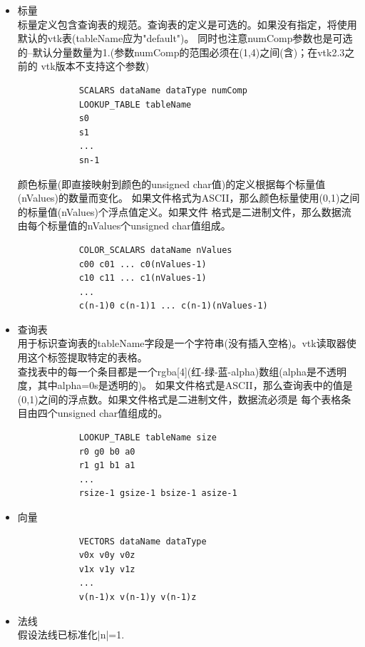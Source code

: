 \documentclass[UTF8]{ctexart}
\begin{document}
\begin{itemize}
    \item {
        标量 \\
        标量定义包含查询表的规范。查询表的定义是可选的。如果没有指定，将使用默认的vtk表(tableName应为"default")。
        同时也注意numComp参数也是可选的--默认分量数量为1.(参数numComp的范围必须在(1,4)之间(含)；在vtk2.3之前的
        vtk版本不支持这个参数)
        \begin{verbatim}
            SCALARS dataName dataType numComp
            LOOKUP_TABLE tableName
            s0
            s1
            ... 
            sn-1
        \end{verbatim}
        颜色标量(即直接映射到颜色的unsigned char值)的定义根据每个标量值(nValues)的数量而变化。
        如果文件格式为ASCII，那么颜色标量使用(0,1)之间的标量值(nValues)个浮点值定义。如果文件
        格式是二进制文件，那么数据流由每个标量值的nValues个unsigned char值组成。
        \begin{verbatim}
            COLOR_SCALARS dataName nValues
            c00 c01 ... c0(nValues-1)
            c10 c11 ... c1(nValues-1)
            ... 
            c(n-1)0 c(n-1)1 ... c(n-1)(nValues-1)
        \end{verbatim}
    }
    \item {
        查询表 \\
        用于标识查询表的tableName字段是一个字符串(没有插入空格)。vtk读取器使用这个标签提取特定的表格。\\
        查找表中的每一个条目都是一个rgba[4](红-绿-蓝-alpha)数组(alpha是不透明度，其中alpha=0s是透明的)。
        如果文件格式是ASCII，那么查询表中的值是(0,1)之间的浮点数。如果文件格式是二进制文件，数据流必须是
        每个表格条目由四个unsigned char值组成的。
        \begin{verbatim}
            LOOKUP_TABLE tableName size
            r0 g0 b0 a0
            r1 g1 b1 a1
            ... 
            rsize-1 gsize-1 bsize-1 asize-1 
        \end{verbatim}
    }
    \item {
        向量\\
        \begin{verbatim}
            VECTORS dataName dataType
            v0x v0y v0z
            v1x v1y v1z
            ... 
            v(n-1)x v(n-1)y v(n-1)z 
        \end{verbatim}
    }
    \item {
        法线\\
        假设法线已标准化|n|=1.
}
\end{itemize}
\end{document}
